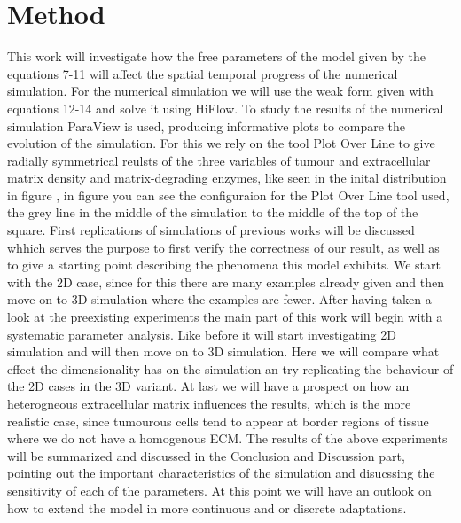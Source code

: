 \section{Method}


This work will investigate how the free parameters of the model given by the equations 7-11 will affect the spatial temporal progress of the numerical simulation. For the numerical simulation we will use the weak form given with equations 12-14 and solve it using HiFlow. To study the results of the numerical simulation ParaView is used, producing informative plots to compare the evolution of the simulation. For this we rely on the tool Plot Over Line to give radially symmetrical reulsts of the three variables of tumour and extracellular matrix density and matrix-degrading enzymes, like seen in the inital distribution in figure , in figure you can see the configuraion for the Plot Over Line tool used, the grey line in the middle of the simulation to the middle of the top of the square.\newline
First replications of simulations of previous works will be discussed whhich serves the purpose to first verify the correctness of our result, as well as to give a starting point describing the phenomena this model exhibits. We start with the 2D case, since for this there are many examples already given and then move on to 3D simulation where the examples are fewer. \newline
After having taken a look at the preexisting experiments the main part of this work will begin with a systematic parameter analysis. Like before it will start investigating 2D simulation and will then move on to 3D simulation. Here we will compare what effect the dimensionality has on the simulation an try replicating the behaviour of the 2D cases in the 3D variant. \newline
At last we will have a prospect on how an heterogneous extracellular matrix influences the results, which is the more realistic case, since tumourous cells tend to appear at border regions of tissue where we do not have a homogenous ECM. \newline
The results of the above experiments will be summarized and discussed in the Conclusion and Discussion part, pointing out the important characteristics of the simulation and disucssing the sensitivity of each of the parameters. At this point we will have an outlook on how to extend the model in more continuous and or discrete adaptations.

